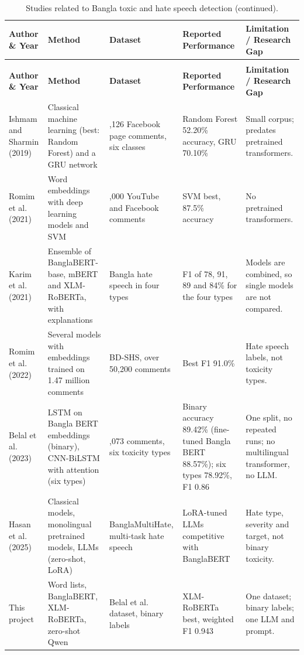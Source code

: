 \begingroup
\footnotesize
\setlength{\tabcolsep}{4pt}
\renewcommand{\arraystretch}{1.2}
\begin{longtable}{>{\raggedright\arraybackslash}p{2.1cm} >{\raggedright\arraybackslash}p{3.0cm} >{\raggedright\arraybackslash}p{2.9cm} >{\raggedright\arraybackslash}p{3.0cm} >{\raggedright\arraybackslash}p{3.0cm}}
  \caption{Studies related to Bangla toxic and hate speech detection.}\label{tab:litreview}\\
  \toprule
      \textbf{Author \& Year} & \textbf{Method} & \textbf{Dataset} & \textbf{Reported Performance} & \textbf{Limitation / Research Gap} \\
  \midrule
  \endfirsthead
  \caption[]{Studies related to Bangla toxic and hate speech detection (continued).}\\
  \toprule
      \textbf{Author \& Year} & \textbf{Method} & \textbf{Dataset} & \textbf{Reported Performance} & \textbf{Limitation / Research Gap} \\
  \midrule
  \endhead
  \bottomrule
  \endfoot
  \bottomrule
  \endlastfoot
    Ishmam and Sharmin (2019) \cite{ishmam2019hateful}
      & Classical machine learning (best: Random Forest) and a GRU network
      & 5,126 Facebook page comments, six classes
      & Random Forest 52.20\% accuracy, GRU 70.10\%
      & Small corpus; predates pretrained transformers. \\
    Romim et al. (2021) \cite{romim2021hate}
      & Word embeddings with deep learning models and SVM
      & 30,000 YouTube and Facebook comments
      & SVM best, 87.5\% accuracy
      & No pretrained transformers. \\
    Karim et al. (2021) \cite{karim2021deephateexplainer}
      & Ensemble of BanglaBERT-base, mBERT and XLM-RoBERTa, with explanations
      & Bangla hate speech in four types
      & F1 of 78, 91, 89 and 84\% for the four types
      & Models are combined, so single models are not compared. \\
    Romim et al. (2022) \cite{romim2022bdshs}
      & Several models with embeddings trained on 1.47 million comments
      & BD-SHS, over 50,200 comments
      & Best F1 91.0\%
      & Hate speech labels, not toxicity types. \\
    Belal et al. (2023) \cite{belal2023toxic}
      & LSTM on Bangla BERT embeddings (binary), CNN-BiLSTM with attention (six types)
      & 16,073 comments, six toxicity types
      & Binary accuracy 89.42\% (fine-tuned Bangla BERT 88.57\%); six types 78.92\%, F1 0.86
      & One split, no repeated runs; no multilingual transformer, no LLM. \\
    Hasan et al. (2025) \cite{hasan2025banglamultihate}
      & Classical models, monolingual pretrained models, LLMs (zero-shot, LoRA)
      & BanglaMultiHate, multi-task hate speech
      & LoRA-tuned LLMs competitive with BanglaBERT
      & Hate type, severity and target, not binary toxicity. \\
    \midrule
    This project
      & Word lists, BanglaBERT, XLM-RoBERTa, zero-shot Qwen
      & Belal et al. dataset, binary labels
      & XLM-RoBERTa best, weighted F1 0.943
      & One dataset; binary labels; one LLM and prompt. \\
\end{longtable}
\endgroup

